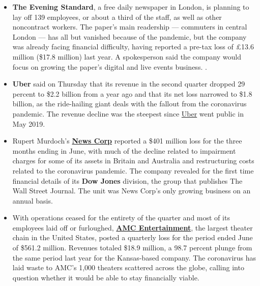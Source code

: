 \begin{itemize}
\item
  \textbf{The Evening Standard}, a free daily newspaper in London, is
  planning to lay off 139 employees, or about a third of the staff, as
  well as other noncontract workers. The paper's main readership ---
  commuters in central London --- has all but vanished because of the
  pandemic, but the company was already facing financial difficulty,
  having reported a pre-tax loss of £13.6 million (\$17.8 million) last
  year. A spokesperson said the company would focus on growing the
  paper's digital and live events business. .
\item
  \textbf{Uber} said on Thursday that its revenue in the second quarter
  dropped 29 percent to \$2.2 billion from a year ago and that its net
  loss narrowed to \$1.8 billion, as the ride-hailing giant deals with
  the fallout from the coronavirus pandemic. The revenue decline was the
  steepest since
  \href{https://www.nytimes3xbfgragh.onion/live/2020/08/06/business/stock-market-today-coronavirus/uber-reports-steep-revenue-decline-as-delivery-outpaces-ride-hailing}{Uber}
  went public in May 2019.
\item
  Rupert Murdoch's
  \textbf{\href{https://www.nytimes3xbfgragh.onion/live/2020/08/06/business/stock-market-today-coronavirus/dow-jones-was-news-corps-only-growing-division-this-past-fiscal-year}{News
  Corp}} reported a \$401 million loss for the three months ending in
  June, with much of the decline related to impairment charges for some
  of its assets in Britain and Australia and restructuring costs related
  to the coronavirus pandemic. The company revealed for the first time
  financial details of its \textbf{Dow Jones} division, the group that
  publishes The Wall Street Journal. The unit was News Corp's only
  growing business on an annual basis.
\item
  With operations ceased for the entirety of the quarter and most of its
  employees laid off or furloughed,
  \textbf{\href{https://www.nytimes3xbfgragh.onion/live/2020/08/06/business/stock-market-today-coronavirus/amcs-quarterly-revenues-dropped-98-7-percent-from-last-year}{AMC
  Entertainment}}, the largest theater chain in the United States,
  posted a quarterly loss for the period ended June of \$561.2 million.
  Revenues totaled \$18.9 million, a 98.7 percent plunge from the same
  period last year for the Kansas-based company. The coronavirus has
  laid waste to AMC's 1,000 theaters scattered across the globe, calling
  into question whether it would be able to stay financially viable.

\end{itemize}
